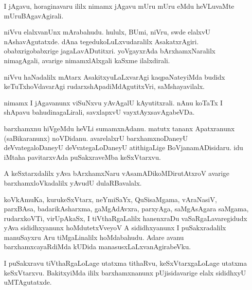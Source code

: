 \documentclass{article}
\begin{document}
\begin{mn}
I jAgavu,  horaginavaru ililx nimamx jAgavu mUru mUru eMdu heVLuvaMte  mUruBAgavAgirali.
\end{mn}

\begin{mn}
niVvu elalxvanUnx  mArabahudu.  hululx, BUmi,  niVru,  swde  elalxvU nAshavAgutatxde.  
dAna tegedukoLuLxvudaralilx AsakatxrAgiri.  obabxrigobabxrige  jagaLavADutitxri.  
yoVgayxrAda  bArxhamxNaralilx  nimagAgali, avarige nimamxlAlxgali kaSxme  ilalxdirali.
\end{mn}

\begin{mn}
niVvu  haNadalilx  mAtarx  AsakitxyuLaLxvarAgi  kaqpaNateyiMda budidx keTuTxhoVdavarAgi  
rudarxshApadiMdAgutitxVri,  saMshayavilalx.
\end{mn}

\begin{mn}
nimamx I jAgavanunx viSuNxvu  yAvAgalU  kAyutitxrali. nAnu koTaTx I shApavu  
bahudinagaLirali, savxlapxvU vayxtAyxsavAgabeVDa.                                     
\end{mn}

\begin{mn}
barxhamxnu hiVgeMdu heVLi sumamxnAdanu.  matutx  tananx Apatxranunx (saBikaranunx) 
noVDidanu.  avarelalxrU  barxhamxnoDaneyU deVvategaloDaneyU deVvategaLoDaneyU 
atithigaLige BoVjanamADisidaru.  idu iMtaha pavitarxvAda  puSakxraveMba  keSxVtarxvu. 
\end{mn}

\begin{mn}
A keSxtarxdalilx yAva bArxhamxNaru vAsamADikoMDirutAtxroV  avarige  barxhamxloVkadalilx  
yAvudU dulaRBavalalx.
\end{mn}

\begin{mn}
koVkAmuKa, kurukeSxVtarx,  neYmiSaYx,  QuSisaMgama, vAraNasiV,  parxBAsa,  badarikAsharxma, 
gaMgAdAvxra, parxyAga, saMgAsAgara saMgama, rudarxkoVTi,  virUpAkaSx, I  tiVthaRgaLalilx  
hanenxraDu vaSaRgaLavaregidudx yAva sididhxyanunx hoMdutetxVveyoV A  sididhxyanunx  I puSakxradalilx  
manuSayxru Aru tiMgaLinalilx hoMdabahudu.  Adare avanu  barxhamxcayaRdiMda kUDida manasusxLaLxvanAgirabeVku.
\end{mn}

\begin{mn}
I puSakxravu tiVthaRgaLoLage utatxma tithaRvu, keSxVtarxgaLoLage  utatxma keSxVtarxvu.  
BakitxyiMda  ililx barxhamxnanunx  pUjisidavarige  elalx sididhxyU uMTAgutatxde.
\end{mn}
\end{document}
